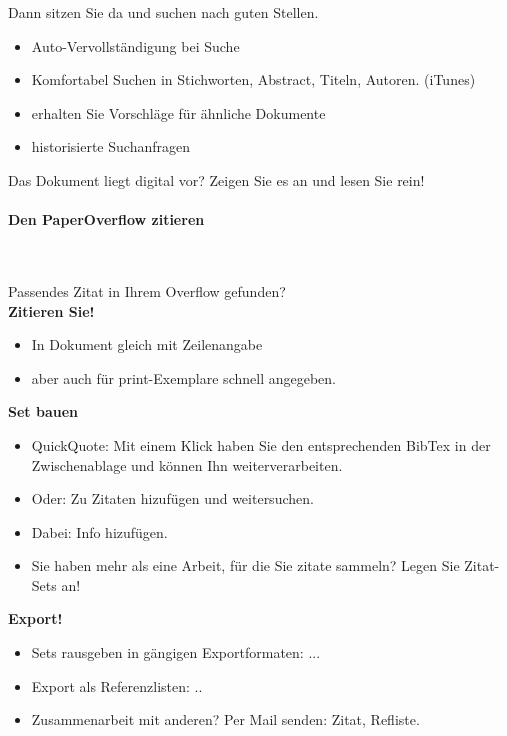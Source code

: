 \documentclass[a4paper,12pt]{article}
\begin{document}
Dann sitzen Sie da und suchen nach guten Stellen.
\begin{itemize}
	\item Auto-Vervollständigung bei Suche
	\item Komfortabel Suchen in Stichworten, Abstract, Titeln, Autoren. (iTunes)
	\item erhalten Sie Vorschläge für ähnliche Dokumente
	\item historisierte Suchanfragen
\end{itemize}

Das Dokument liegt digital vor? Zeigen Sie es an und lesen Sie rein!

\paragraph{Den PaperOverflow zitieren}\ 

Passendes Zitat in Ihrem Overflow gefunden? \\

\textbf{Zitieren Sie!} 
\begin{itemize}
	\item In Dokument gleich mit Zeilenangabe
	\item aber auch für print-Exemplare schnell angegeben.
\end{itemize}

\textbf{Set bauen}
\begin{itemize}
	\item QuickQuote: Mit einem Klick haben Sie den entsprechenden BibTex in der Zwischenablage und können Ihn weiterverarbeiten.
	\item Oder: Zu Zitaten hizufügen und weitersuchen.
	\item Dabei: Info hizufügen.
	\item Sie haben mehr als eine Arbeit, für die Sie zitate sammeln? Legen Sie Zitat-Sets an!
\end{itemize}

\textbf{Export!}
\begin{itemize}
	\item Sets rausgeben in gängigen Exportformaten: ...
	\item Export als Referenzlisten: ..
	\item Zusammenarbeit mit anderen? Per Mail senden: Zitat, Refliste.
\end{itemize}

\end{document}
